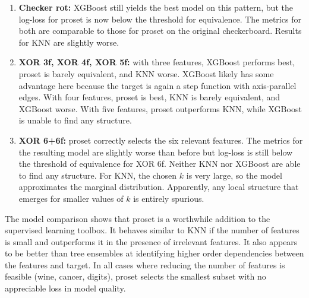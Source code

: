\begin{enumerate}
\item\textbf{Checker rot:} XGBoost still yields the best model on this pattern, but the log-loss for proset is now below the threshold for equivalence.
The metrics for both are comparable to those for proset on the original checkerboard.
Results for KNN are slightly worse.
%
\item\textbf{XOR 3f, XOR 4f, XOR 5f:} with three features, XGBoost performs best, proset is barely equivalent, and KNN worse.
XGBoost likely has some advantage here because the target is again a step function with axis-parallel edges.
With four features, proset is best, KNN is barely equivalent, and XGBoost worse.
With five features, proset outperforms KNN, while XGBoost is unable to find any structure.
%
\item\textbf{XOR 6+6f:} proset correctly selects the six relevant features.
The metrics for the resulting model are slightly worse than before but log-loss is still below the threshold of equivalence for XOR 6f.
Neither KNN nor XGBoost are able to find any structure.
For KNN, the chosen $k$ is very large, so the model approximates the marginal distribution.
Apparently, any local structure that emerges for smaller values of $k$ is entirely spurious.
\end{enumerate}
%
The model comparison shows that proset is a worthwhile addition to the supervised learning toolbox.
It behaves similar to KNN if the number of features is small and outperforms it in the presence of irrelevant features.
It also appears to be better than tree ensembles at identifying higher order dependencies between the features and target.
In all cases where reducing the number of features is feasible (wine, cancer, digits), proset selects the smallest subset with no appreciable loss in model quality.
\endinput
